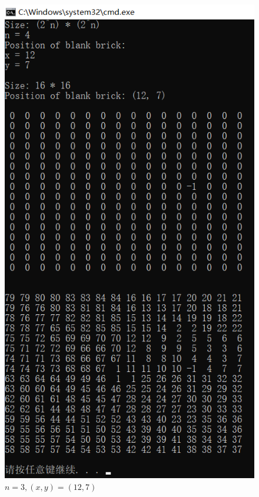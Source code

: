 \documentclass[a4paper]{ctexart}
\begin{document}
\begin{sloppypar}
\begin{figure}[h]
        \includegraphics[scale=0.7]{images/test2.png}
        \caption{$n = 3, (x, y) = (12, 7)$}
    \end{figure}
\end{sloppypar}
\end{document}
